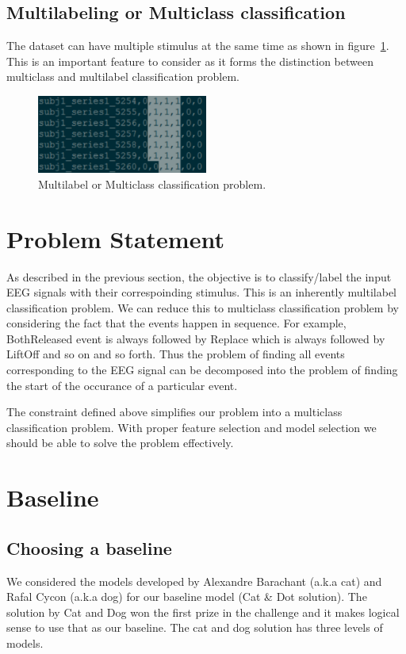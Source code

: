 \documentclass[final,leqno,onefignum,onetabnum]{siamltexmm}
\begin{document}
\subsection{Multilabeling or Multiclass classification}
The dataset can have multiple stimulus at the same time as shown in figure~\ref{fig:label_or_class}.
This is an important feature to consider as it forms the distinction between multiclass and multilabel classification problem.
\begin{figure}[ht!]
  \centering
  \includegraphics[width=0.5\textwidth]{images/multilabels}
  \caption{Multilabel or Multiclass classification problem.\label{fig:label_or_class}}
\end{figure}

\section{Problem Statement}
As described in the previous section, the objective is to classify/label the input EEG signals with their correspoinding stimulus.  
This is an inherently multilabel classification problem.  
We can reduce this to multiclass classification problem by considering the fact that the events happen in sequence.  
For example, BothReleased event is always followed by Replace which is always followed by LiftOff and so on and so forth.
Thus the problem of finding all events corresponding to the EEG signal can be decomposed into the problem of finding the start of the occurance of a particular event.

The constraint defined above simplifies our problem into a multiclass classification problem.  With proper feature selection and model selection we should be able to solve the problem effectively.

\section{Baseline}
\subsection{Choosing a baseline}
We considered the models developed by Alexandre Barachant (a.k.a cat) and Rafal Cycon (a.k.a dog) for our baseline model (Cat \& Dot solution)\cite{website:cat_dog_solution}.  
The solution by Cat and Dog won the first prize in the challenge and it makes logical sense to use that as our baseline.   
The cat and dog solution has three levels of models.
\end{document}
